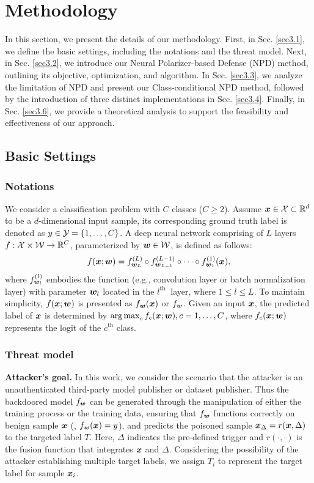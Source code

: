 
\section{Methodology\label{sec3}}
In this section, we present the details of our methodology. First, in Sec. \ref{sec3.1}, we define the basic settings, including the notations and the threat model.  
Next, in Sec. \ref{sec3.2}, we introduce our Neural Polarizer-based Defense (NPD) method, outlining its objective, optimization, and algorithm.  
In Sec. \ref{sec3.3}, we analyze the limitation of NPD and present our Class-conditional NPD method, followed by the introduction of three distinct implementations in Sec. \ref{sec3.4}.  
Finally, in Sec. \ref{sec3.6}, we provide a theoretical analysis to support the feasibility and effectiveness of our approach.


\subsection{Basic Settings\label{sec3.1}}
\subsubsection{Notations} We consider a classification problem with $C$ classes ($C\geq 2$). Assume $\bm{x}\in {\mathcal{X}} \subset \mathbb{R}^d$ to be a $d$-dimensional input sample, its corresponding ground truth label is denoted as $y\in {\mathcal{Y}} = \{1,\dots,C\}$. A deep neural network comprising of $L$ layers $f:{\mathcal{X}}\times{\mathcal{W}}\to \mathbb{R}^C$, parameterized by $\bm{w}\in{\mathcal{W}}$, is defined as follows:
\begin{equation}
f(\bm{x} ; \bm{w})=f^{(L)}_{\bm{w}_{L}} \circ f^{(L-1)}_{\bm{w}_{L-1}} \circ \cdots \circ f^{(1)}_{\bm{w}_{1}} (\bm{x}),
\end{equation}
where $f^{(l)}_{\bm{w}_{l}}$ embodies the function (e.g., convolution layer or batch normalization layer) with parameter $\bm{w}_{l}$ located in the $l^{\text {th }}$ layer, where $1 \leq l \leq L$. To maintain simplicity, $f(\bm{x} ; \bm{w})$ is presented as $f_{\bm{w}}(\bm{x})$ or $f_{\bm{w}}$. Given an input $\bm{x}$, the predicted label of $\bm{x}$ is determined by $\operatorname*{arg\,max}_c f_c(\bm{x};\bm{w}), c=1,\ldots,C$, where $f_c(\bm{x}; \bm{w})$ represents the logit of the $c^{\text {th}}$ class.

\subsubsection{Threat model} 
\textbf{Attacker's goal.} In this work, we consider the scenario that the attacker is an unauthenticated third-party model publisher or dataset publisher. Thus the backdoored model $f_{\bm{w}}$ can be generated through the manipulation of either the training process or the training data, ensuring that $f_{\bm{w}}$ functions correctly on benign sample $\bm{x}$ (\ie, $f_{\bm{w}}(\bm{x}) = y$), and predicts the poisoned sample $\bm{x}_{\Delta} = r(\bm{x}, \Delta)$ to the targeted label $T$. Here, $\Delta$ indicates the pre-defined trigger and $r(\cdot, \cdot)$ is the fusion function that integrates $\bm{x}$ and $\Delta$. 
Considering the possibility of the attacker establishing multiple target labels, we assign $T_i$ to represent the target label for sample $\bm{x}_i$.

